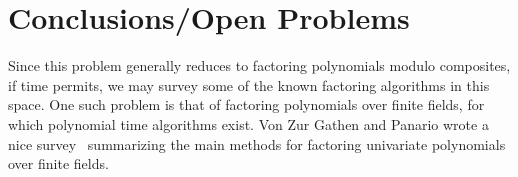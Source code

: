 \documentclass[letterpaper,twocolumn,10pt]{article}
\begin{document}
\section{Conclusions/Open Problems}

Since this problem generally reduces to factoring polynomials modulo composites, if time permits, we may survey some of the known factoring algorithms in this space. One such problem is that of factoring polynomials over finite fields, for which polynomial time algorithms exist. Von Zur Gathen and Panario wrote a nice survey~\cite{Gathen} summarizing the main methods for factoring univariate polynomials over finite fields. 



{\footnotesize 
}


\end{document}
